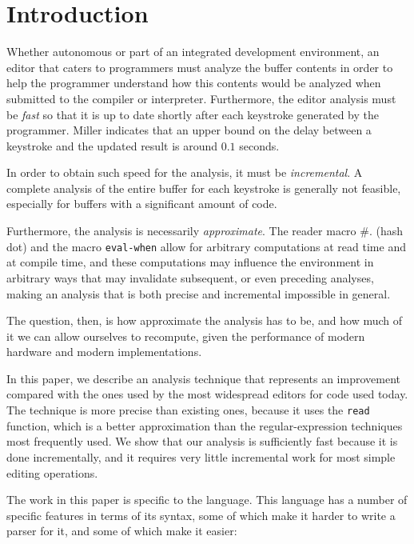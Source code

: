 \section{Introduction}

Whether autonomous or part of an integrated development environment,
an editor that caters to \commonlisp{} programmers must analyze the
buffer contents in order to help the programmer understand how this
contents would be analyzed when submitted to the \commonlisp{}
compiler or interpreter.  Furthermore, the editor analysis must be
\emph{fast} so that it is up to date shortly after each keystroke
generated by the programmer.  Miller
\cite{Miller:1968:RTM:1476589.1476628} indicates that an upper bound
on the delay between a keystroke and the updated result is around
$0.1$ seconds.

In order to obtain such speed for the analysis, it must be
\emph{incremental}.  A complete analysis of the entire buffer for each
keystroke is generally not feasible, especially for buffers with a
significant amount of code.

Furthermore, the analysis is necessarily \emph{approximate}.  The
reader macro \#. (hash dot) and the macro \texttt{eval-when} allow for
arbitrary computations at read time and at compile time, and these
computations may influence the environment in arbitrary ways that may
invalidate subsequent, or even preceding analyses, making an analysis
that is both precise and incremental impossible in general.

The question, then, is how approximate the analysis has to be, and how
much of it we can allow ourselves to recompute, given the performance
of modern hardware and modern \commonlisp{} implementations.

In this paper, we describe an analysis technique that represents an
improvement compared with the ones used by the most widespread editors
for \commonlisp{} code used today.  The technique is more precise than
existing ones, because it uses the \commonlisp{} \texttt{read}
function, which is a better approximation than the regular-expression
techniques most frequently used.  We show that our analysis is
sufficiently fast because it is done incrementally, and it requires
very little incremental work for most simple editing operations.

The work in this paper is specific to the \commonlisp{} language.
This language has a number of specific features in terms of its
syntax, some of which make it harder to write a parser for it, and
some of which make it easier:


